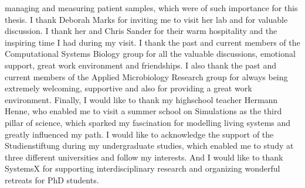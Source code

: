 managing and measuring patient samples, which were of such importance for this thesis. I
thank Deborah Marks for inviting me to visit her lab and for valuable discussion. I thank her
and Chris Sander for their warm hospitality and the inspiring time I had during my visit.
I thank the past and current members of the Computational Systems Biology group for all the
valuable discussions, emotional support, great work environment and friendships. I also thank
the past and current members of the Applied Microbiology Research group for always being
extremely welcoming, supportive and also for providing a great work environment.
Finally, I would like to thank my highschool teacher Hermann Henne, who enabled me to visit
a summer school on Simulations as the third pillar of science, which sparked my fascination
for modelling living systems and greatly influenced my path. I would like to acknowledge the
support of the Studienstiftung during my undergraduate studies, which enabled me to study at
three different universities and follow my interests. And I would like to thank SystemsX for
supporting interdisciplinary research and organizing wonderful retreats for PhD students.

\endgroup
